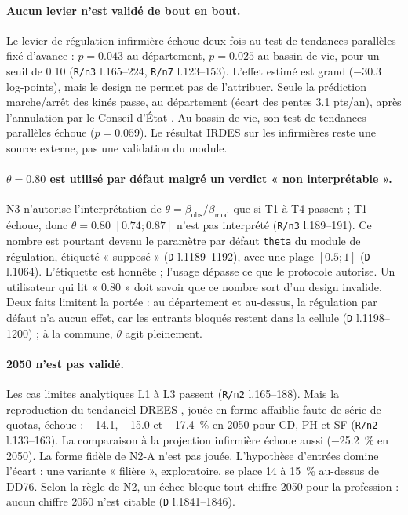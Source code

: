 \paragraph{Aucun levier n'est validé de bout en bout.} Le levier de régulation infirmière échoue
deux fois au test de tendances parallèles fixé d'avance : $p = \num{0.043}$\mesure{} au
département, $p = \num{0.025}$\mesure{} au bassin de vie, pour un seuil de \num{0.10}\suppose{}
(\texttt{R/n3} l.165--224, \texttt{R/n7} l.123--153). L'effet estimé est grand
(\num{-30.3}\mesure{} log-points), mais le design ne permet pas de l'attribuer. Seule la prédiction
marche/arrêt des kinés passe, au département (écart des pentes \num{+3.1}\mesure{} pts/an), après
l'annulation par le Conseil d'État \citep{ce2014mk}. Au bassin de vie, son test de tendances
parallèles échoue ($p = \num{0.059}$\mesure). Le résultat IRDES sur les infirmières
\citep{irdes270} reste une source externe, pas une validation du module.

\paragraph{$\theta = \num{0.80}$ est utilisé par défaut malgré un verdict « non interprétable ».}
N3 n'autorise l'interprétation de $\theta = \beta_{\text{obs}}/\beta_{\text{mod}}$ que si T1 à T4
passent ; T1 échoue, donc $\theta = \num{0.80}$ $[\num{0.74} ; \num{0.87}]$\mesure{} n'est pas
interprété (\texttt{R/n3} l.189--191). Ce nombre est pourtant devenu le paramètre par défaut
\texttt{theta} du module de régulation, étiqueté « supposé » (\texttt{D} l.1189--1192), avec une
plage $[\num{0.5} ; 1]$\suppose{} (\texttt{D} l.1064). L'étiquette est honnête ; l'usage dépasse
ce que le protocole autorise. Un utilisateur qui lit « \num{0.80} » doit savoir que ce nombre sort
d'un design invalide. Deux faits limitent la portée : au département et au-dessus, la régulation
par défaut n'a aucun effet, car les entrants bloqués restent dans la cellule (\texttt{D}
l.1198--1200) ; à la commune, $\theta$ agit pleinement.

\paragraph{2050 n'est pas validé.} Les cas limites analytiques L1 à L3 passent (\texttt{R/n2}
l.165--188). Mais la reproduction du tendanciel DREES \citep{drees2021dd76}, jouée en forme
affaiblie faute de série de quotas, échoue : \num{-14.1}\mesure, \num{-15.0}\mesure{} et
\num{-17.4}\mesure{}~\% en 2050 pour CD, PH et SF (\texttt{R/n2} l.133--163). La comparaison à la
projection infirmière \citep{er1319} échoue aussi (\num{-25.2}\mesure{}~\% en 2050). La forme
fidèle de N2-A n'est pas jouée. L'hypothèse d'entrées domine l'écart : une variante « filière »,
exploratoire, se place \num{+14} à \num{+15}\mesure{}~\% au-dessus de DD76. Selon la règle de N2,
un échec bloque tout chiffre 2050 pour la profession : aucun chiffre 2050 n'est citable
(\texttt{D} l.1841--1846).

